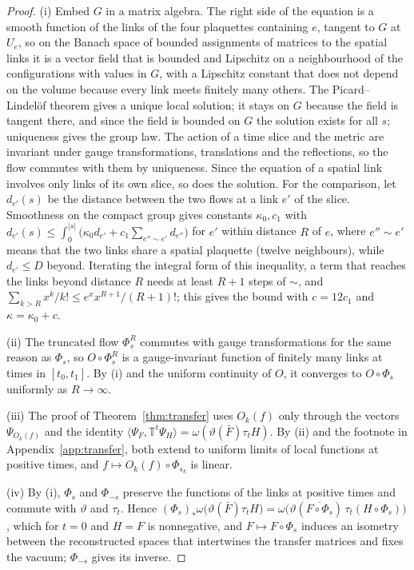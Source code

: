 \documentclass[aps,prd,twocolumn,superscriptaddress,nofootinbib,longbibliography,floatfix,amsmath,amssymb,10pt]{revtex4-2}
\theoremstyle{definition}
\theoremstyle{remark}
\newcommand{\ip}[2]{\langle #1,#2\rangle}
\begin{document}
\begin{proof}
(i) Embed $G$ in a matrix algebra. The right side of the equation is a smooth
function of the links of the four plaquettes containing $e$, tangent to $G$
at $U_e$, so on the Banach space of bounded assignments of matrices to the
spatial links it is a vector field that is bounded and Lipschitz on a
neighbourhood of the configurations with values in $G$, with a Lipschitz
constant that does not depend on the volume because every link meets
finitely many others. The Picard--Lindel\"of theorem gives a unique local
solution; it stays on $G$ because the field is tangent there, and since the
field is bounded on $G$ the solution exists for all $s$; uniqueness gives the
group law. The action of a time slice and the metric are invariant under
gauge transformations, translations and the reflections, so the flow
commutes with them by uniqueness. Since the equation of a spatial link
involves only links of its own slice, so does the solution. For the
comparison, let $d_{e'}(s)$ be the distance between the two flows at a link
$e'$ of the slice. Smoothness on the compact group gives constants $\kappa_0,c_1$ with
$d_{e'}(s)\le\int_0^{|s|}\bigl(\kappa_0d_{e'}+c_1\sum_{e''\sim e'}d_{e''}\bigr)$
for $e'$ within
distance $R$ of $e$, where $e''\sim e'$ means that the two links share a
spatial plaquette (twelve neighbours), while $d_{e'}\le D$ beyond. Iterating
the integral form of this inequality, a term that reaches the links beyond
distance $R$ needs at least $R+1$ steps of $\sim$, and
$\sum_{k>R}x^k/k!\le e^xx^{R+1}/(R+1)!$; this gives the bound with $c=12c_1$
and $\kappa=\kappa_0+c$.

(ii) The truncated flow $\Phi^R_s$ commutes with gauge transformations for the
same reason as $\Phi_s$, so $O\circ\Phi^R_s$ is a gauge-invariant function of
finitely many links at times in $[t_0,t_1]$. By (i) and the uniform
continuity of $O$, it converges to $O\circ\Phi_s$ uniformly as $R\to\infty$.

(iii) The proof of Theorem~\ref{thm:transfer} uses $O_k(f)$ only through the
vectors $\Psi_{O_k(f)}$ and the identity
$\ip{\Psi_F}{\mathbb T^t\Psi_H}=\omega(\vartheta(\bar F)\tau_tH)$. By (ii) and the
footnote in Appendix~\ref{app:transfer}, both extend to uniform limits of
local functions at positive times, and $f\mapsto O_k(f)\circ\Phi_{s_k}$ is
linear.

(iv) By (i), $\Phi_s$ and $\Phi_{-s}$ preserve the functions of the links at
positive times and commute with $\vartheta$ and $\tau_t$. Hence
$(\Phi_s)_*\omega\bigl(\vartheta(\bar F)\tau_tH\bigr)=\omega\bigl(\vartheta(\overline{F\circ
\Phi_s})\,\tau_t(H\circ\Phi_s)\bigr)$, which for $t=0$ and $H=F$ is
nonnegative, and $F\mapsto F\circ\Phi_s$ induces an isometry between the
reconstructed spaces that intertwines the transfer matrices and fixes the
vacuum; $\Phi_{-s}$ gives its inverse.
\end{proof}
\end{document}
